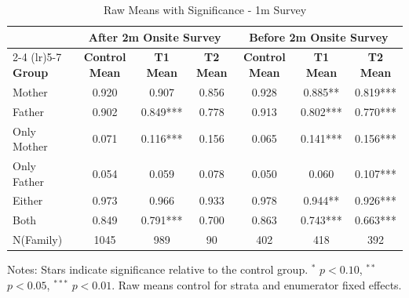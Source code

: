 \begin{table}[htbp]
\centering
\begin{threeparttable}
\caption{Raw Means with Significance  - 1m Survey}
\begin{tabular}{lcccccc}
\toprule
& \multicolumn{3}{c}{After 2m Onsite Survey} & \multicolumn{3}{c}{Before 2m Onsite Survey} \\
\cmidrule(lr){2-4} \cmidrule(lr){5-7}
\textbf{Group} & \textbf{Control Mean} & \textbf{T1 Mean} & \textbf{T2 Mean} & \textbf{Control Mean} & \textbf{T1 Mean} & \textbf{T2 Mean} \\
\midrule
Mother &  0.920 & 0.907 &  0.856 & 0.928 & 0.885** &  0.819***  \\
Father &  0.902 &  0.849*** &  0.778 & 0.913 &  0.802*** &  0.770***  \\
Only Mother &  0.071 & 0.116*** &  0.156 &  0.065 & 0.141*** &  0.156*** \\
Only Father &  0.054 &  0.059 &  0.078 &  0.050 &  0.060 &  0.107*** \\
Either &  0.973 &  0.966 &  0.933 &  0.978 &  0.944** &  0.926*** \\
Both &  0.849 &  0.791*** &  0.700 & 0.863 &  0.743*** &  0.663*** \\
N(Family) & 1045 & 989 & 90 & 402 & 418 & 392 \\
\bottomrule
\end{tabular}
\begin{tablenotes}
\small
Notes: Stars indicate significance relative to the control group. 
$^{*}$ $p<0.10$, $^{**}$ $p<0.05$, $^{***}$ $p<0.01$.
Raw means control for strata and enumerator fixed effects.
\end{tablenotes}
\end{threeparttable}
\end{table}


